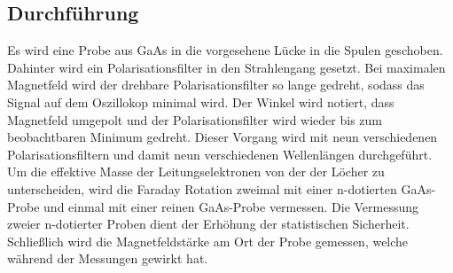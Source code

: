 \subsection{Durchführung}
\label{subsec:Durchfuehrung}
Es wird eine Probe aus GaAs in die vorgesehene Lücke in die Spulen geschoben. 
Dahinter wird ein Polarisationsfilter in den Strahlengang gesetzt.
Bei maximalen Magnetfeld wird der drehbare Polarisationsfilter so lange gedreht, sodass das Signal auf dem Oszillokop minimal wird.
Der Winkel wird notiert, dass Magnetfeld umgepolt und der Polarisationsfilter wird wieder bis zum beobachtbaren Minimum gedreht.
Dieser Vorgang wird mit neun verschiedenen Polarisationsfiltern und damit neun verschiedenen Wellenlängen durchgeführt.
Um die effektive Masse der Leitungselektronen von der der Löcher zu unterscheiden, wird die Faraday Rotation zweimal mit einer n-dotierten GaAs-Probe und einmal mit einer reinen GaAs-Probe vermessen.
Die Vermessung zweier n-dotierter Proben dient der Erhöhung der statistischen Sicherheit.
Schließlich wird die Magnetfeldstärke am Ort der Probe gemessen, welche während der Messungen gewirkt hat.
